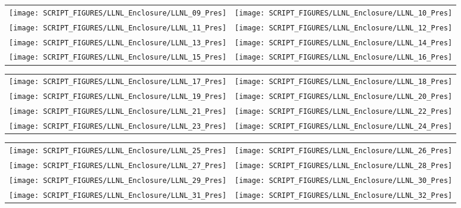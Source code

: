 \begin{figure}[p]
\begin{tabular*}{\textwidth}{l@{\extracolsep{\fill}}r}
\texttt{[image: SCRIPT\_FIGURES/LLNL\_Enclosure/LLNL\_09\_Pres]} &
\texttt{[image: SCRIPT\_FIGURES/LLNL\_Enclosure/LLNL\_10\_Pres]} \\
\texttt{[image: SCRIPT\_FIGURES/LLNL\_Enclosure/LLNL\_11\_Pres]} &
\texttt{[image: SCRIPT\_FIGURES/LLNL\_Enclosure/LLNL\_12\_Pres]} \\
\texttt{[image: SCRIPT\_FIGURES/LLNL\_Enclosure/LLNL\_13\_Pres]} &
\texttt{[image: SCRIPT\_FIGURES/LLNL\_Enclosure/LLNL\_14\_Pres]} \\
\texttt{[image: SCRIPT\_FIGURES/LLNL\_Enclosure/LLNL\_15\_Pres]} &
\texttt{[image: SCRIPT\_FIGURES/LLNL\_Enclosure/LLNL\_16\_Pres]}
\end{tabular*}
\label{LLNL_Enclosure_Pres_2}
\end{figure}

\begin{figure}[p]
\begin{tabular*}{\textwidth}{l@{\extracolsep{\fill}}r}
\texttt{[image: SCRIPT\_FIGURES/LLNL\_Enclosure/LLNL\_17\_Pres]} &
\texttt{[image: SCRIPT\_FIGURES/LLNL\_Enclosure/LLNL\_18\_Pres]} \\
\texttt{[image: SCRIPT\_FIGURES/LLNL\_Enclosure/LLNL\_19\_Pres]} &
\texttt{[image: SCRIPT\_FIGURES/LLNL\_Enclosure/LLNL\_20\_Pres]} \\
\texttt{[image: SCRIPT\_FIGURES/LLNL\_Enclosure/LLNL\_21\_Pres]} &
\texttt{[image: SCRIPT\_FIGURES/LLNL\_Enclosure/LLNL\_22\_Pres]} \\
\texttt{[image: SCRIPT\_FIGURES/LLNL\_Enclosure/LLNL\_23\_Pres]} &
\texttt{[image: SCRIPT\_FIGURES/LLNL\_Enclosure/LLNL\_24\_Pres]}
\end{tabular*}
\label{LLNL_Enclosure_Pres_3}
\end{figure}

\begin{figure}[p]
\begin{tabular*}{\textwidth}{l@{\extracolsep{\fill}}r}
\texttt{[image: SCRIPT\_FIGURES/LLNL\_Enclosure/LLNL\_25\_Pres]} &
\texttt{[image: SCRIPT\_FIGURES/LLNL\_Enclosure/LLNL\_26\_Pres]} \\
\texttt{[image: SCRIPT\_FIGURES/LLNL\_Enclosure/LLNL\_27\_Pres]} &
\texttt{[image: SCRIPT\_FIGURES/LLNL\_Enclosure/LLNL\_28\_Pres]} \\
\texttt{[image: SCRIPT\_FIGURES/LLNL\_Enclosure/LLNL\_29\_Pres]} &
\texttt{[image: SCRIPT\_FIGURES/LLNL\_Enclosure/LLNL\_30\_Pres]} \\
\texttt{[image: SCRIPT\_FIGURES/LLNL\_Enclosure/LLNL\_31\_Pres]} &
\texttt{[image: SCRIPT\_FIGURES/LLNL\_Enclosure/LLNL\_32\_Pres]}
\end{tabular*}
\label{LLNL_Enclosure_Pres_4}
\end{figure}

